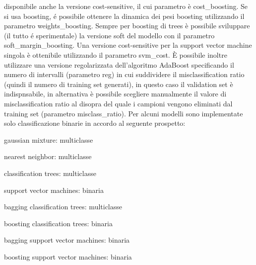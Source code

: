 disponibile anche la versione cost-sensitive, il cui parametro \`{e}
cost\_boosting. Se si usa boosting, \'e possibile ottenere la dinamica
dei pesi boosting utilizzando il parametro weights\_boosting. Sempre
per boosting di trees \`e possibile sviluppare (il tutto \'e
sperimentale) la versione soft del modello con il parametro
soft\_margin\_boosting. Una versione cost-sensitive per la support
vector machine singola \`e ottenibile utilizzando il parametro
svm\_cost.
\`E possibile inoltre utilizzare una versione regolarizzata dell'algoritmo
AdaBoost specificando il numero di intervalli (parametro reg) in cui
suddividere il misclassification ratio (quindi il numero di
training set generati), in questo caso il validation set \`e indispnsabile, in
alternativa \`e possibile scegliere manualmente il valore di misclassification
ratio al disopra del quale i campioni vengono eliminati dal training set
(parametro misclass\_ratio).
Per alcuni modelli sono implementate solo classificazione
binarie in accordo al seguente prospetto:

\noindent
gaussian mixture: multiclasse

\noindent
nearest neighbor: multiclasse

\noindent
classification trees: multiclasse

\noindent
support vector machines: binaria

\noindent
bagging classification trees: multiclasse

\noindent
boosting classification trees: binaria

\noindent
bagging support vector machines: binaria

\noindent
boosting support vector machines: binaria

